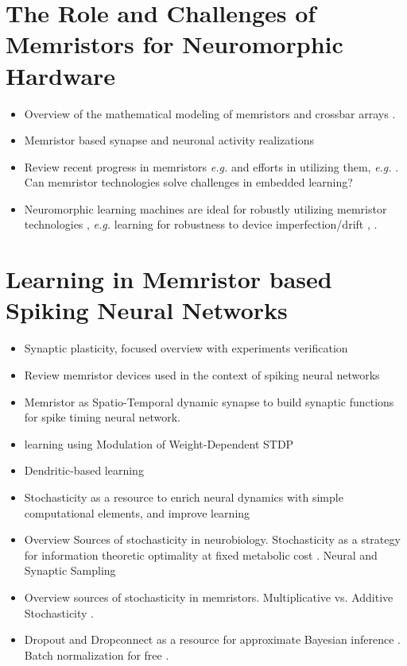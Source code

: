 \documentclass[english]{article}
\renewcommand{\cite}{\citep}
\begin{document}
\section{The Role and Challenges of Memristors for Neuromorphic Hardware}
\begin{itemize}
  \item Overview of the mathematical modeling of memristors \cite{Radwan_Fouda16_mathmode} and crossbar arrays \cite{Fouda_etal18_modeanal}.
  \item Memristor based synapse and neuronal activity realizations \cite{nair2017differential,hu2017compact,wu2015cmos,mostafa2016beyond,liu2017memristor,lin2017capacitor}
  \item Review recent progress in memristors \emph{e.g.} \cite{Kim_etal17_remoepit} and efforts in utilizing them, \emph{e.g.} \cite{Chen_etal15_mitieffe}. Can memristor technologies solve challenges in embedded learning?
  \item Neuromorphic learning machines are ideal for robustly utilizing memristor technologies \cite{Neftci18_datapowe}, \emph{e.g.} learning for robustness to device imperfection/drift \cite{Serb_etal16_unsulear}, \cite{Querlioz_etal15_bioiprog}.   
\end{itemize}

\section{Learning in Memristor based Spiking Neural Networks}
\begin{itemize}
  \item Synaptic plasticity, focused overview with experiments verification  \cite{serrano2013stdp,saighi2015plasticity,prezioso2016self,prezioso2016spiking,pedretti2017memristive}
  \item Review memristor devices used in the context of spiking neural networks  \cite{Bill_Legenstein14_compmemr,Mostafa_etal15_implspik,Querlioz_etal15_bioiprog}
  \item Memristor as Spatio-Temporal dynamic synapse to build synaptic functions for spike timing neural network. \cite{hu2017compact} 
  \item learning using Modulation of Weight-Dependent STDP \cite{zheng2018learning}
 \item Dendritic-based learning \cite{wu2018dendritic}
  \item Stochasticity as a resource to enrich neural dynamics with simple computational elements, and improve learning \cite{naous2016memristor,ly2018role}
  \item Overview Sources of stochasticity in neurobiology. Stochasticity as a strategy for information theoretic optimality at fixed metabolic cost \cite{Harris_etal12_synaener}. Neural and Synaptic Sampling \cite{Fiser_etal10_statopti}
  \item Overview sources of stochasticity in memristors. Multiplicative vs. Additive Stochasticity \cite{al2015memristors,ly2018role}.
  \item Dropout and Dropconnect as a resource for approximate Bayesian inference \cite{Neftci17_stocsyna,Gal_Ghahramani15_dropas}. Batch normalization for free \cite{Neftci17_stocsyna}.
\end{itemize}
\end{document}
